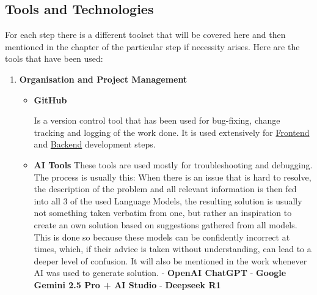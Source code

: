 \subsection{Tools and Technologies}
For each step there is a different toolset that will be covered here and then mentioned in the chapter of the particular step if necessity arises. Here are the tools that have been used:

\begin{enumerate}
	\item \textbf{Organisation and Project Management}
	\begin{itemize}
		\item\textbf{GitHub}
		
		Is a version control tool that has been used for bug-fixing, change tracking and logging of the work done. It is used extensively for \hyperref[sec:FrontenddDev]{Frontend} and \hyperref[sec:Backenddev]{Backend} development steps. 
		\item\textbf{AI Tools}
		\newline These tools are used mostly for troubleshooting and debugging. The process is usually this: When there is an issue that is hard to resolve, the description of the problem and all relevant information is then fed into all 3 of the used Language Models, the resulting solution is usually not something taken verbatim from one, but rather an inspiration to create an own solution based on suggestions gathered from all models. This is done so because these models can be confidently incorrect at times, which, if their advice is taken without understanding, can lead to a deeper level of confusion. It will also be mentioned in the work whenever AI was used to generate solution.
		\newline - \textbf{OpenAI ChatGPT}
		\newline - \textbf{Google Gemini 2.5 Pro + AI Studio}
		\newline - \textbf{Deepseek R1}
		
	\end{itemize}
\end{enumerate}
